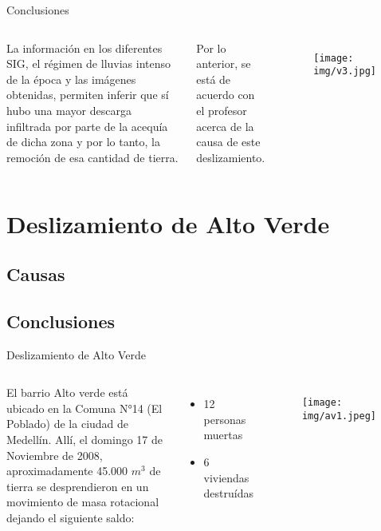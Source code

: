 \documentclass[11pt]{beamer}
\begin{document}
\begin{frame}{Conclusiones}
	\begin{columns}[t]
	
	
	\justify
	La información en los diferentes SIG, el régimen de lluvias intenso de la época y las imágenes obtenidas, permiten inferir que sí hubo una mayor descarga infiltrada por parte de la acequía de dicha zona y por lo tanto, la remoción de esa cantidad de tierra. 
	
	Por lo anterior, se está de acuerdo con el profesor acerca de la causa de este deslizamiento. 
	
	
	\begin{figure}
		\texttt{[image: img/v3.jpg]}
	\end{figure}
\end{columns}	

\end{frame}

\section{Deslizamiento de Alto Verde} 
\subsection{Causas}
\subsection{Conclusiones}

\begin{frame}{Deslizamiento de Alto Verde}
	\begin{columns}[t]
	
	El barrio Alto verde está ubicado en la Comuna N°14 (El Poblado) de la ciudad de Medellín. Allí, el domingo 17 de Noviembre de 2008, aproximadamente 45.000 $m^{3}$ de tierra se desprendieron en un movimiento de masa rotacional dejando el siguiente saldo:
	
	\begin{itemize}
		\item 12 personas muertas
		\item 6 viviendas destruídas
	\end{itemize}
	
	
	\begin{figure}
		\texttt{[image: img/av1.jpeg]}
	\end{figure}
	
	\end{columns}
\end{frame}
\end{document}
